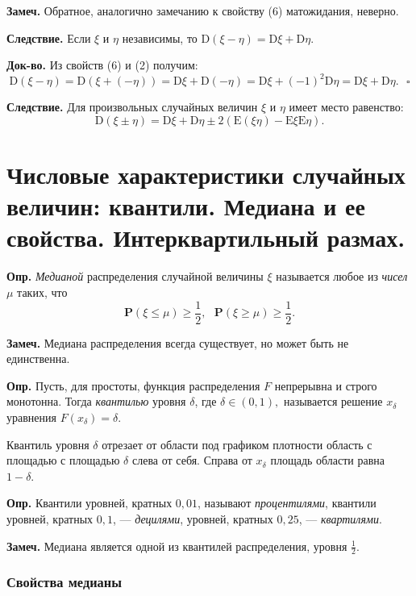 \documentclass[oneside,final,14pt]{extreport}
\newcommand\mydef{{\bf Опр.}}
\newcommand\mynote{{\bf Замеч.}}
\newcommand\mycon{{\bf Следствие.}}
\newcommand\myqed{{\bf Док-во.}}
\newcommand\myprob[1]{{\mathbf{P}(#1)}}
\theoremstyle{definition}
\begin{document}
\begin{enumerate}
    \mynote{} Обратное, аналогично замечанию к свойству (6) матожидания, неверно.
    
    \mycon{} Если $\xi$ и $\eta$ независимы, то $\mathrm{D}(\xi-\eta)=\mathrm{D} \xi+\mathrm{D} \eta$. 
    
    \myqed{} Из свойств (6) и (2) получим: 
    $$\mathrm{D}(\xi-\eta)=\mathrm{D}(\xi+(-\eta))=\mathrm{D} \xi+\mathrm{D}(-\eta)=\mathrm{D} \xi+(-1)^{2} \mathrm{D} \eta=\mathrm{D} \xi+\mathrm{D} \eta. ~~~ \square$$
    
    \mycon{} Для произвольных случайных величин $\xi$ и $\eta$ имеет место равенство:
    $$\mathrm{D}(\xi \pm \eta)=\mathrm{D} \xi+\mathrm{D} \eta \pm 2(\mathrm{E}(\xi \eta)-\mathrm{E} \xi \mathrm{E} \eta).$$
    
\end{enumerate}

\section {Числовые характеристики случайных величин: квантили. Медиана и ее свойства. Интерквартильный размах.}

\mydef{} {\it Медианой} распределения случайной величины $\xi$ называется любое из {\it чисел} $\mu$ таких, что
$$\myprob{\xi \leqslant \mu} \geqslant \frac{1}{2}, ~~~ \myprob{\xi \geqslant \mu} \geqslant \frac{1}{2}.$$

\mynote{} Медиана распределения всегда существует, но может быть не единственна.

\mydef{} Пусть, для простоты, функция распределения $F$ непрерывна и строго монотонна. Тогда {\it квантилью} уровня $\delta$, где $\delta \in (0, 1), $ называется решение $x_\delta$ уравнения $F(x_\delta) = \delta.$ 

Квантиль уровня $\delta$ отрезает от области под графиком плотности область с площадью с площадью $\delta$ слева от себя. Справа от $x_\delta$ площадь области равна $1 - \delta$.

\mydef{} Квантили уровней, кратных $0,01$, называют {\it процентилями}, квантили уровней, кратных $0,1$, — {\it децилями}, уровней, кратных $0,25$, — {\it квартилями}.

\mynote{} Медиана является одной из квантилей распределения, уровня $\frac{1}{2}.$

\subsubsection{Свойства медианы}
\end{document}
